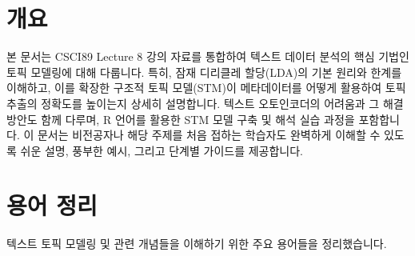 \documentclass[11pt,a4paper]{article}
\begin{document}
\newpage
\section*{개요}
본 문서는 CSCI89 Lecture 8 강의 자료를 통합하여 텍스트 데이터 분석의 핵심 기법인 토픽 모델링에 대해 다룹니다. 특히, 잠재 디리클레 할당(LDA)의 기본 원리와 한계를 이해하고, 이를 확장한 구조적 토픽 모델(STM)이 메타데이터를 어떻게 활용하여 토픽 추출의 정확도를 높이는지 상세히 설명합니다. 텍스트 오토인코더의 어려움과 그 해결 방안도 함께 다루며, R 언어를 활용한 STM 모델 구축 및 해석 실습 과정을 포함합니다. 이 문서는 비전공자나 해당 주제를 처음 접하는 학습자도 완벽하게 이해할 수 있도록 쉬운 설명, 풍부한 예시, 그리고 단계별 가이드를 제공합니다.

\newpage
\section*{용어 정리}
텍스트 토픽 모델링 및 관련 개념들을 이해하기 위한 주요 용어들을 정리했습니다.
\end{document}
